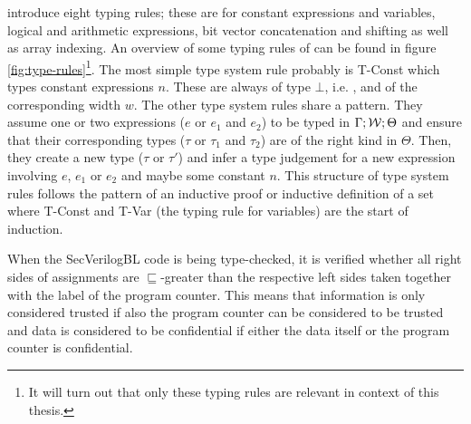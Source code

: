 \citeauthor{Ferraiuolo17} introduce eight typing rules; these are for constant expressions and variables, logical and arithmetic expressions, bit vector concatenation and shifting as well as array indexing.
An overview of some typing rules of \cite{Ferraiuolo17} can be found in figure \ref{fig:type-rules}\footnote{%
    It will turn out that only these typing rules are relevant in context of this thesis.
}.
The most simple type system rule probably is T-Const which types constant expressions $ n $.
These are always of type $ \bot $, i.e. \PT, and of the corresponding width $ w $.
The other type system rules share a pattern.
They assume one or two expressions ($ e $ or $ e_1 $ and $ e_2 $) to be typed in $ \Gamma; \mathcal{W}; \Theta $ and ensure that their corresponding types ($ \tau $ or $ \tau_1 $ and $ \tau_2 $) are of the right kind in $ \Theta $.
Then, they create a new type ($ \tau $ or $ \tau' $) and infer a type judgement for a new expression involving $ e $, $ e_1 $ or $ e_2 $ and maybe some constant $ n $.
This structure of type system rules follows the pattern of an inductive proof or inductive definition of a set where T-Const and T-Var (the typing rule for variables) are the start of induction.

When the SecVerilogBL code is being type-checked, it is verified whether all right sides of assignments are $ \sqsubseteq $-greater than the respective left sides taken together with the label of the program counter.
This means that information is only considered trusted if also the program counter can be considered to be trusted and data is considered to be confidential if either the data itself or the program counter is confidential.

